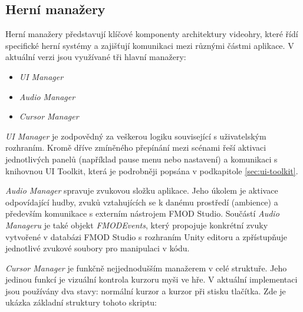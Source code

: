 \newpage

\subsection{Herní manažery}
\label{sec:herni-manazery}
Herní manažery představují klíčové komponenty architektury videohry, které řídí specifické herní systémy a zajišťují komunikaci mezi různými částmi aplikace. V aktuální verzi jsou využívané tři hlavní manažery:
\begin{itemize}
    \item \emph{UI Manager}
    \item \emph{Audio Manager}
    \item \emph{Cursor Manager}
\end{itemize}

\emph{UI Manager} je zodpovědný za veškerou logiku související s uživatelským rozhraním. Kromě dříve zmíněného přepínání mezi scénami řeší aktivaci jednotlivých panelů (například pause menu nebo nastavení) a komunikaci s knihovnou UI Toolkit, která je podrobněji popsána v podkapitole \ref{sec:ui-toolkit}.

\emph{Audio Manager} spravuje zvukovou složku aplikace. Jeho úkolem je aktivace odpovídající hudby, zvuků vztahujících se k danému prostředí (ambience) a především komunikace s externím nástrojem FMOD Studio. Součástí \emph{Audio Manageru} je také objekt \emph{FMODEvents}, který propojuje konkrétní zvuky vytvořené v databázi FMOD Studio s rozhraním Unity editoru a zpřístupňuje jednotlivé zvukové soubory pro manipulaci v kódu.

\emph{Cursor Manager} je funkčně nejjednodušším manažerem v celé struktuře. Jeho jedinou funkcí je vizuální kontrola kurzoru myši ve hře. V aktuální implementaci jsou používány dva stavy: normální kurzor a kurzor při stisku tlačítka. Zde je ukázka základní struktury tohoto skriptu:

\newpage

